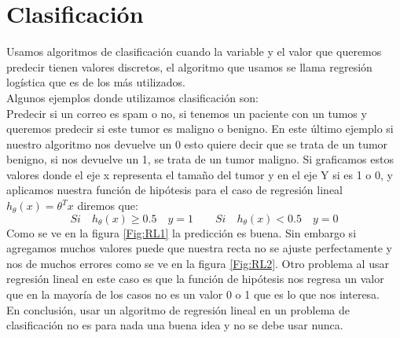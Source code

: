\documentclass{report}
\begin{document}
\section{Clasificación}
Usamos algoritmos de clasificación cuando la variable y el valor que queremos predecir tienen valores discretos, el algoritmo que usamos se llama regresión logística que es de los más utilizados.\\Algunos ejemplos donde utilizamos clasificación son:\\Predecir si un correo es spam o no, si tenemos un paciente con un tumos y queremos predecir si este tumor es maligno o benigno. En este último ejemplo si nuestro algoritmo nos devuelve un 0 esto quiere decir que se trata de un tumor benigno, si nos devuelve un 1, se trata de un tumor maligno. Si graficamos estos valores donde el eje x representa el tamaño del tumor y en el eje Y si es 1 o 0, y aplicamos nuestra función de hipótesis para el caso de regresión lineal $h_\theta(x)=\theta^Tx$ diremos que:
\[
Si\quad h_\theta(x)\geq 0.5\quad y=1\qquad Si\quad h_\theta(x)<0.5\quad y=0
\]
Como se ve en la figura \ref{Fig:RL1} la predicción es buena.
Sin embargo si agregamos muchos valores puede que nuestra recta no se ajuste perfectamente y nos de muchos errores como se ve en la figura \ref{Fig:RL2}. Otro problema al usar regresión lineal en este caso es que la función de hipótesis nos regresa un valor que en la mayoría de los casos no es un valor 0 o 1 que es lo que nos interesa.\\En conclusión, usar un algoritmo de regresión lineal en un problema de clasificación no es para nada una buena idea y no se debe usar nunca.
\end{document}

